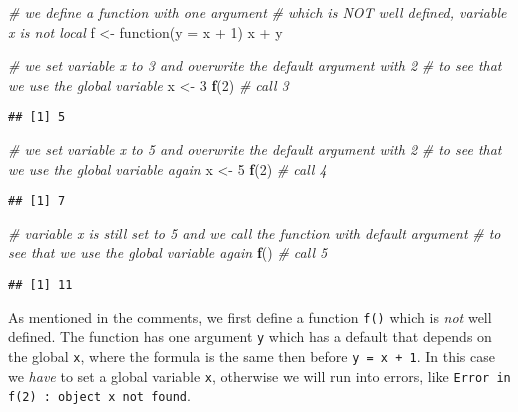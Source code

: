 \documentclass[11,]{article}
\newenvironment{Shaded}{\begin{snugshade}}{\end{snugshade}}
\newcommand{\KeywordTok}[1]{\textcolor[rgb]{0.13,0.29,0.53}{\textbf{{#1}}}}
\newcommand{\DataTypeTok}[1]{\textcolor[rgb]{0.13,0.29,0.53}{{#1}}}
\newcommand{\DecValTok}[1]{\textcolor[rgb]{0.00,0.00,0.81}{{#1}}}
\newcommand{\StringTok}[1]{\textcolor[rgb]{0.31,0.60,0.02}{{#1}}}
\newcommand{\CommentTok}[1]{\textcolor[rgb]{0.56,0.35,0.01}{\textit{{#1}}}}
\newcommand{\NormalTok}[1]{{#1}}
\begin{document}
\begin{Shaded}
\begin{Highlighting}[]
\CommentTok{# we define a function with one argument}
\CommentTok{# which is NOT well defined, variable x is not local}
\NormalTok{f <-}\StringTok{ }\NormalTok{function(}\DataTypeTok{y =} \NormalTok{x +}\StringTok{ }\DecValTok{1}\NormalTok{) x +}\StringTok{ }\NormalTok{y}

\CommentTok{# we set variable x to 3 and overwrite the default argument with 2}
\CommentTok{# to see that we use the global variable}
\NormalTok{x <-}\StringTok{ }\DecValTok{3}
\KeywordTok{f}\NormalTok{(}\DecValTok{2}\NormalTok{)  }\CommentTok{# call 3}
\end{Highlighting}
\end{Shaded}

\begin{verbatim}
## [1] 5
\end{verbatim}

\begin{Shaded}
\begin{Highlighting}[]
\CommentTok{# we set variable x to 5 and overwrite the default argument with 2}
\CommentTok{# to see that we use the global variable again}
\NormalTok{x <-}\StringTok{ }\DecValTok{5}
\KeywordTok{f}\NormalTok{(}\DecValTok{2}\NormalTok{)  }\CommentTok{# call 4}
\end{Highlighting}
\end{Shaded}

\begin{verbatim}
## [1] 7
\end{verbatim}

\begin{Shaded}
\begin{Highlighting}[]
\CommentTok{# variable x is still set to 5 and we call the function with default argument}
\CommentTok{# to see that we use the global variable again}
\KeywordTok{f}\NormalTok{()  }\CommentTok{# call 5}
\end{Highlighting}
\end{Shaded}

\begin{verbatim}
## [1] 11
\end{verbatim}

As mentioned in the comments, we first define a function \texttt{f()}
which is \emph{not} well defined. The function has one argument
\texttt{y} which has a default that depends on the global \texttt{x},
where the formula is the same then before \texttt{y = x + 1}. In this
case we \emph{have} to set a global variable \texttt{x}, otherwise we
will run into errors, like
\texttt{Error in f(2) : object \textquotesingle{}x\textquotesingle{} not found}.
\end{document}
